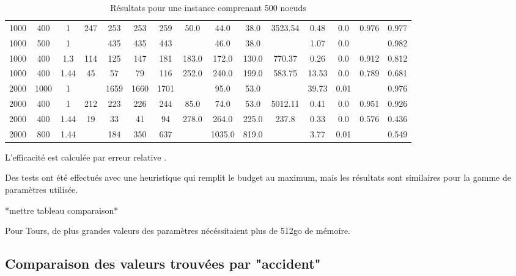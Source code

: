 \documentclass[a4paper,12pt,twoside,french]{article}
\begin{document}
\begin{table}[h]
\centering
\caption{Résultats pour une instance comprenant 500 noeuds}
\vspace{0.5cm}
\begin{tabular}{|c|c|c|c|c|c|c|c|c|c|c|c|c|c|c|}
\hline
1000 & 400 & 1 & 247 & 253 & 253 & 259 & 50.0 & 44.0 & 38.0 & 3523.54 & 0.48 & 0.0 & 0.976 & 0.977 \\
1000 & 500 & 1 &  & 435 & 435 & 443 &  & 46.0 & 38.0 &  & 1.07 & 0.0 &  & 0.982 \\
1000 & 400 & 1.3 & 114 & 125 & 147 & 181 & 183.0 & 172.0 & 130.0 & 770.37 & 0.26 & 0.0 & 0.912 & 0.812 \\
1000 & 400 & 1.44 & 45 & 57 & 79 & 116 & 252.0 & 240.0 & 199.0 & 583.75 & 13.53 & 0.0 & 0.789 & 0.681 \\
2000 & 1000 & 1 &  & 1659 & 1660 & 1701 &  & 95.0 & 53.0 &  & 39.73 & 0.01 &  & 0.976 \\
2000 & 400 & 1 & 212 & 223 & 226 & 244 & 85.0 & 74.0 & 53.0 & 5012.11 & 0.41 & 0.0 & 0.951 & 0.926 \\
2000 & 400 & 1.44 & 19 & 33 & 41 & 94 & 278.0 & 264.0 & 225.0 & 237.8 & 0.33 & 0.0 & 0.576 & 0.436 \\
2000 & 800 & 1.44 &  & 184 & 350 & 637 &  & 1035.0 & 819.0 &  & 3.77 & 0.01 &  & 0.549 \\
 \hline 
 \end{tabular}
\end{table}

L'efficacité est calculée par erreur relative \cite{erreur_relative}.

Des tests ont été effectués avec une heuristique qui remplit le budget au maximum, mais les résultats sont similaires pour la gamme de paramètres utilisée.

*mettre tableau comparaison*

Pour Tours, de plus grandes valeurs des paramètres nécéssitaient plus de 512go de mémoire.

\subsection{Comparaison des valeurs trouvées par "accident"}
\end{document}
